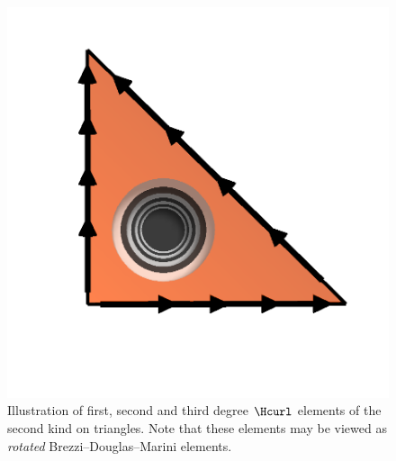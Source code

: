 \begin{figure}
\begin{center}
    \includegraphics[width=\elmfigsizetriple]{chapters/kirby-6/png/NED2_3_2d.png}
    \caption{Illustration of first, second and third degree \nedelec{}
      $\Hcurl$ elements of the second kind on triangles. Note that
      these elements may be viewed as \emph{rotated}
      Brezzi--Douglas--Marini elements.}
  \end{center}
  \label{kirby-6:fig:ned2:tri}
\end{figure}


